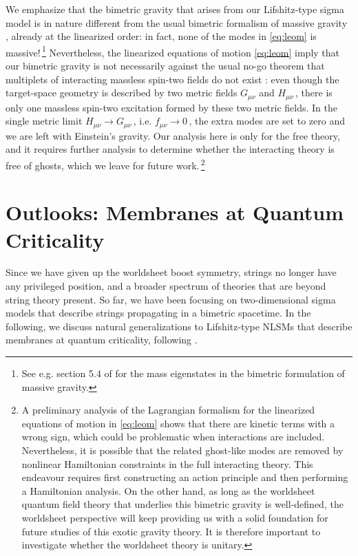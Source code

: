 \documentclass[11pt]{article}
\begin{document}
We emphasize that the bimetric gravity that arises from our Lifshitz-type sigma model is in nature different from the usual bimetric formalism of massive gravity \cite{Hassan:2011zd}, already at the linearized order: in fact, none of the modes in \eqref{eq:leom} is massive!\,\footnote{See e.g. section 5.4 of \cite{deRham:2014zqa} for the mass eigenstates in the bimetric formulation of massive gravity.} Nevertheless, the linearized equations of motion \eqref{eq:leom} imply that our bimetric gravity is not necessarily against the usual no-go theorem that multiplets of interacting massless spin-two fields do not exist \cite{Boulanger:2000rq}: even though the target-space geometry is described by two metric fields $G_{\mu\nu}$ and $H_{\mu\nu}$\,, there is only one massless spin-two excitation formed by these two metric fields. In the single metric limit $H_{\mu\nu} \rightarrow G_{\mu\nu}$\,, i.e. $f_{\mu\nu} \rightarrow 0$\,, the extra modes are set to zero and we are left with Einstein's gravity. Our analysis here is only for the free theory, and it requires further analysis to determine whether the interacting theory is free of ghosts, which we leave for future work.\,\footnote{A preliminary analysis of the Lagrangian formalism for the linearized equations of motion in \eqref{eq:leom} shows that there are kinetic terms with a wrong sign, which could be problematic when interactions are included. Nevertheless, it is possible that the related ghost-like modes are removed by nonlinear Hamiltonian constraints in the full interacting theory. This endeavour requires first constructing an action principle and then performing a Hamiltonian analysis. On the other hand, as long as the worldsheet quantum field theory that underlies this bimetric gravity is well-defined, the worldsheet perspective will keep providing us with a solid foundation for future studies of this exotic gravity theory. It is therefore important to investigate whether the worldsheet theory is unitary.}




\section{Outlooks: Membranes at Quantum Criticality} \label{sec:omqc}

Since we have given up the worldsheet boost symmetry, strings no longer have any privileged position, and a broader spectrum of theories that are beyond string theory present. So far, we have been focusing on two-dimensional sigma models that describe strings propagating in a bimetric spacetime. In the following, we discuss natural generalizations to Lifshitz-type NLSMs that describe membranes at quantum criticality, following \cite{Horava:2008ih, ssl, as}.
\end{document}
